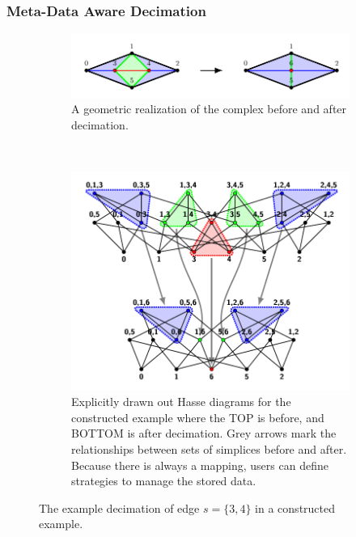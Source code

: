 	\subsubsection{Meta-Data Aware Decimation}
		\begin{figure}[ht!]
			\centering
			\begin{subfigure}[ht!]{0.7\textwidth}
				\includegraphics[width=\textwidth]{Figures/decimation/decimation}
				\caption{
					A geometric realization of the complex before and after decimation.
				}
				\label{fig:decexample}
			\end{subfigure}\\
			\begin{subfigure}[ht!]{0.7\textwidth}
				\includegraphics[width=\textwidth]{Figures/decdetail/decdetail}
				\caption{
					Explicitly drawn out Hasse diagrams for the constructed example where the TOP is before, and BOTTOM is after decimation. Grey arrows mark the relationships between sets of simplices before and after. Because there is always a mapping, users can define strategies to manage the stored data.
				}
				\label{fig:decdetail}
			\end{subfigure}
			\caption{The example decimation of edge $s = \{3,4\}$ in a constructed example.}
			\label{fig:decimation}
		\end{figure}

